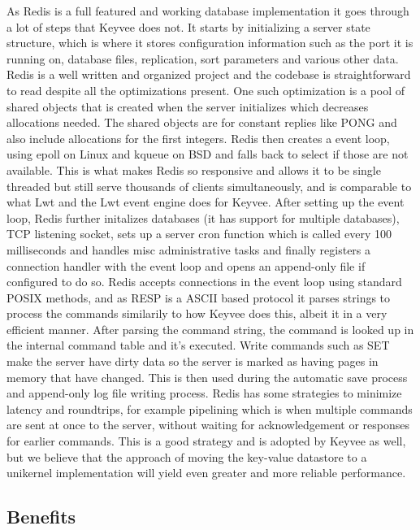 \documentclass[english,10pt,twocolumn]{article}
\begin{document}
As Redis is a full featured and working database implementation it goes through a lot of steps that Keyvee does not.
It starts by initializing a server state structure, which is where it stores configuration information such as the port it is running on, database files, replication, sort parameters and various other data.
Redis is a well written and organized project and the codebase is straightforward to read despite all the optimizations present.
One such optimization is a pool of shared objects that is created when the server initializes which decreases allocations needed.
The shared objects are for constant replies like PONG and also include allocations for the first integers. \cite{redisunderthehood}
Redis then creates a event loop, using epoll on Linux and kqueue on BSD and falls back to select if those are not available.
This is what makes Redis so responsive and allows it to be single threaded but still serve thousands of clients simultaneously, and is comparable to what Lwt and the Lwt event engine does for Keyvee.
After setting up the event loop, Redis further initalizes databases (it has support for multiple databases), TCP listening socket, sets up a server cron function which is called every 100 milliseconds and handles misc administrative tasks and finally registers a connection handler with the event loop and opens an append-only file if configured to do so.
Redis accepts connections in the event loop using standard POSIX methods, and as RESP is a ASCII based protocol it parses strings to process the commands similarily to how Keyvee does this, albeit it in a very efficient manner.
After parsing the command string, the command is looked up in the internal command table and it's executed.
Write commands such as SET make the server have dirty data so the server is marked as having pages in memory that have changed.
This is then used during the automatic save process and append-only log file writing process.
Redis has some strategies to minimize latency and roundtrips, for example pipelining which is when multiple commands are sent at once to the server, without waiting for acknowledgement or responses for earlier commands.
This is a good strategy and is adopted by Keyvee as well, but we believe that the approach of moving the key-value datastore to a unikernel implementation will yield even greater and more reliable performance.


\subsection{Benefits}
\end{document}
